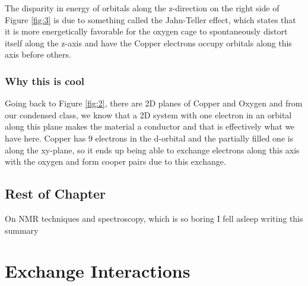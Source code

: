 \documentclass[11pt,onecolumn]{article}
\begin{document}
The disparity in energy of orbitals along the z-direction on the right side of Figure \ref{fig:3} is due to something called the Jahn-Teller effect, which states that it is more energetically favorable for the oxygen cage to spontaneously distort itself along the z-axis and have the Copper electrons occupy orbitals along this axis before others.

\subsubsection{Why this is cool}

Going back to Figure \ref{fig:2}, there are 2D planes of Copper and Oxygen and from our condensed class, we know that a 2D system with one electron in an orbital along this plane makes the material a conductor and that is effectively what we have here. Copper has 9 electrons in the d-orbital and the partially filled one is along the xy-plane, so it ends up being able to exchange electrons along this axis with the oxygen and form cooper pairs due to this exchange.

\subsection{Rest of Chapter}

On NMR techniques and spectroscopy, which is so boring I fell asleep writing this summary

\section{Exchange Interactions}
\end{document}
